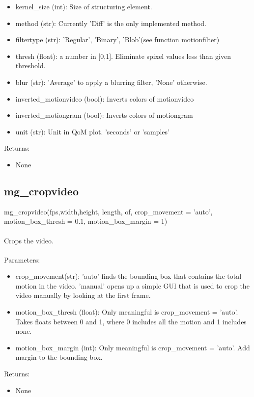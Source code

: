 \documentclass[9pt]{extarticle}
\begin{document}
    \begin{itemize}
    \item [] kernel\_size (int): Size of structuring element.
   \item [] method (str): Currently 'Diff' is the only implemented method. 
    \item [] filtertype (str): 'Regular', 'Binary', 'Blob'(see function motionfilter) 
    \item [] thresh (float): a number in [0,1]. Eliminate spixel values less than given threshold.
    \item [] blur (str): 'Average' to apply a blurring filter, 'None' otherwise.
    \item [] inverted\_motionvideo (bool): Inverts colors of motionvideo
    \item [] inverted\_motiongram (bool): Inverts colors of motiongram
    \item [] unit (str): Unit in QoM plot. 'seconds' or 'samples'
    \end{itemize}
    Returns:
    \begin{itemize}
    \item [] None
    \end{itemize}


\subsection{mg\_cropvideo}

    mg\_cropvideo(fps,width,height, length, of, crop\_movement = 'auto', motion\_box\_thresh = 0.1, motion\_box\_margin = 1)
    \\\\
	Crops the video.\\\\
Parameters:
        \begin{itemize}
		\item [] crop\_movement(str): 'auto' finds the bounding box that contains the total motion in the video. 'manual' opens up a simple GUI that is used to crop the video manually by looking at the first frame.

		\item [] motion\_box\_thresh (float): Only meaningful is crop\_movement = 'auto'. Takes floats between 0 and 1, where 0 includes all the motion and 1 includes none.
		
		\item [] motion\_box\_margin (int): Only meaningful is crop\_movement = 'auto'. Add margin to the bounding box.
        \end{itemize}
	Returns:
    \begin{itemize}
	   \item [] None
    \end{itemize}
\end{document}
